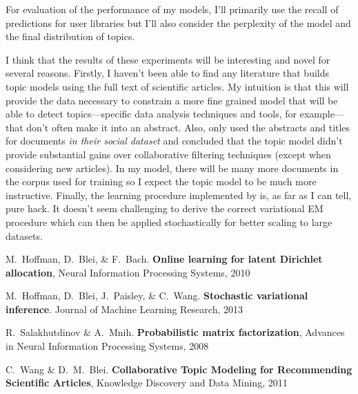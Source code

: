 \documentclass[11pt]{article}
\newcommand{\etal}{\emph{et al.}}
\begin{document}
For evaluation of the performance of my models, I'll primarily use the
recall of predictions for user libraries but I'll also consider the perplexity
of the model and the final distribution of topics.

I think that the results of these experiments will be interesting and novel
for several reasons.
Firstly, I haven't been able to find any literature that builds topic models
using the full text of scientific articles.
My intuition is that this will provide the data necessary to constrain a more
fine grained model that will be able to detect topics---specific data analysis
techniques and tools, for example---that don't often make it into an abstract.
Also, \citet{blei} only used the abstracts and titles for documents \emph{in
their social dataset} and concluded that the topic model didn't provide
substantial gains over collaborative filtering techniques (except when
considering new articles).
In my model, there will be many more documents in the corpus used for training
so I expect the topic model to be much more instructive.
Finally, the learning procedure implemented by \citet{blei} is, as far as I
can tell, pure hack.
It doesn't seem challenging to derive the correct variational EM procedure
which can then be applied stochastically for better scaling to large datasets.

\begin{thebibliography}{}\raggedright

M.~Hoffman, D.~Blei, \& F.~Bach. \textbf{Online learning for latent Dirichlet
allocation}, Neural Information Processing Systems, 2010

\bibitem[Hoffman \etal(2013)]{ov}
M.~Hoffman, D.~Blei, J.~Paisley, \& C.~Wang. \textbf{Stochastic variational
inference}. Journal of Machine Learning Research, 2013

R.~Salakhutdinov \& A.~Mnih. \textbf{Probabilistic matrix factorization},
Advances in Neural Information Processing Systems, 2008

C.~Wang \& D.~M.~Blei. \textbf{Collaborative Topic Modeling for
Recommending Scientiﬁc Articles}, Knowledge Discovery and Data Mining, 2011

\end{thebibliography}
\end{document}
